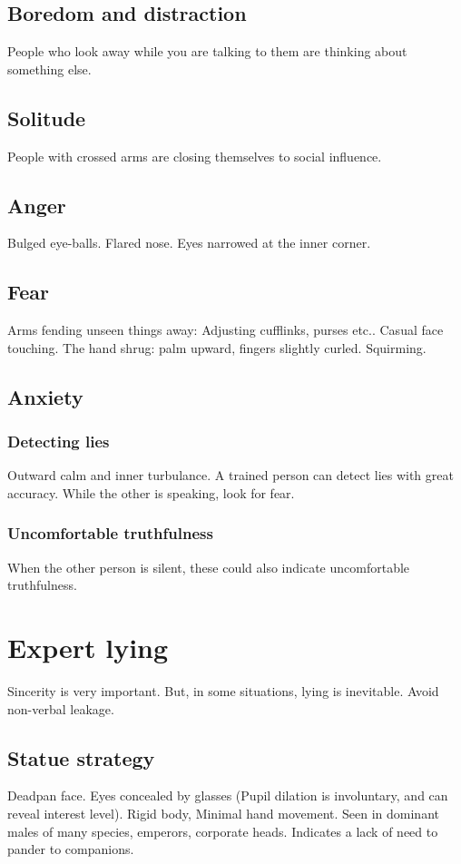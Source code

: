 \documentclass[oneside, article]{memoir}
\begin{document}
\subsection{Boredom and distraction}
People who look away while you are talking to them are thinking about something else.

\subsection{Solitude}
People with crossed arms are closing themselves to social influence.

\subsection{Anger}
Bulged eye-balls. Flared nose. Eyes narrowed at the inner corner.

\subsection{Fear}
Arms fending unseen things away: Adjusting cufflinks, purses etc..
Casual face touching. The hand shrug: palm upward, fingers slightly curled. Squirming.

\subsection{Anxiety}
\subsubsection{Detecting lies}
Outward calm and inner turbulance. A trained person can detect lies with great accuracy. While the other is speaking, look for fear.

\subsubsection{Uncomfortable truthfulness}
When the other person is silent, these could also indicate uncomfortable truthfulness.

\section{Expert lying}
Sincerity is very important. But, in some situations, lying is inevitable. Avoid non-verbal leakage.

\subsection{Statue strategy}
\subitem Deadpan face.
\subitem Eyes concealed by glasses (Pupil dilation is involuntary, and can reveal interest level).
\subitem Rigid body, Minimal hand movement.
\subitem Seen in dominant males of many species, emperors, corporate heads. Indicates a lack of need to pander to companions.
\end{document}
